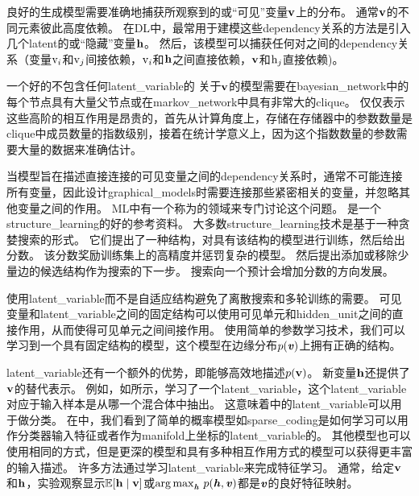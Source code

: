 良好的生成模型需要准确地捕获所观察到的或``可见''变量$\mathbf{v}$上的分布。
通常$\mathbf{v}$的不同元素彼此高度依赖。
在\gls{DL}中，最常用于建模这些\gls{dependency}关系的方法是引入几个\gls{latent}的或``隐藏''变量$\mathbf{h}$。
然后，该模型可以捕获任何对之间的\gls{dependency}关系（变量$\mathrm{v}_i$和$\mathrm{v}_j$间接依赖，$\mathrm{v}_i$和$\mathbf{h}$之间直接依赖，$\mathbf{v}$和$\mathrm{h}_j$直接依赖)。

一个好的不包含任何\gls{latent_variable}的 关于$\mathbf{v}$的模型需要在\gls{bayesian_network}中的每个节点具有大量父节点或在\gls{markov_network}中具有非常大的\gls{clique}。
仅仅表示这些高阶的相互作用是昂贵的，首先从计算角度上，存储在存储器中的参数数量是\gls{clique}中成员数量的指数级别，接着在统计学意义上，因为这个指数数量的参数需要大量的数据来准确估计。


当模型旨在描述直接连接的可见变量之间的\gls{dependency}关系时，通常不可能连接所有变量，因此设计\gls{graphical_models}时需要连接那些紧密相关的变量，并忽略其他变量之间的作用。
\gls{ML}中有一个称为的领域来专门讨论这个问题。
\citet{koller-book2009}是一个\gls{structure_learning}的好的参考资料。
大多数\gls{structure_learning}技术是基于一种贪婪搜索的形式。
它们提出了一种结构，对具有该结构的模型进行训练，然后给出分数。 
该分数奖励训练集上的高精度并惩罚复杂的模型。
然后提出添加或移除少量边的候选结构作为搜索的下一步。
搜索向一个预计会增加分数的方向发展。 


使用\gls{latent_variable}而不是自适应结构避免了离散搜索和多轮训练的需要。 
可见变量和\gls{latent_variable}之间的固定结构可以使用可见单元和\gls{hidden_unit}之间的直接作用，从而使得可见单元之间间接作用。
使用简单的参数学习技术，我们可以学习到一个具有固定结构的模型，这个模型在边缘分布$p(\boldsymbol{\mathit{v}})$上拥有正确的结构。


\gls{latent_variable}还有一个额外的优势，即能够高效地描述$p(\mathbf{v})$。
新变量$\mathbf{h}$还提供了$\mathbf{v}$的替代表示。
例如，如所示，学习了一个\gls{latent_variable}，这个\gls{latent_variable}对应于输入样本是从哪一个混合体中抽出。
这意味着中的\gls{latent_variable}可以用于做分类。
在中，我们看到了简单的概率模型如\gls{sparse_coding}是如何学习可以用作分类器输入特征或者作为\gls{manifold}上坐标的\gls{latent_variable}的。
其他模型也可以使用相同的方式，但是更深的模型和具有多种相互作用方式的模型可以获得更丰富的输入描述。
许多方法通过学习\gls{latent_variable}来完成特征学习。
通常，给定$\mathbf{v}$和$\mathbf{h}$，实验观察显示$\mathbb{E}[\mathbf{h}\mid\mathbf{v}]$或${\arg\max}_{\boldsymbol{\mathit{h}}}\ p(\boldsymbol{\mathit{h}},\boldsymbol{\mathit{v}})$都是$\boldsymbol{\mathit{v}}$的良好特征映射。

